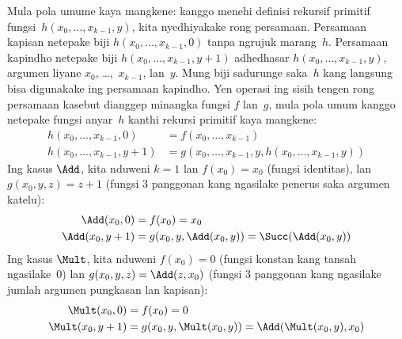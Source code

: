 \documentclass[../../../include/open-logic-section]{subfiles}
\begin{document}
Mula pola umume kaya mangkene: kanggo menehi definisi rekursif
primitif fungsi~$h(x_0, \dots, x_{k-1}, y)$, kita nyedhiyakake
rong persamaan. Persamaan kapisan netepake biji
$h(x_0, \dots, x_{k-1}, 0)$ tanpa ngrujuk marang~$h$.
Persamaan kapindho netepake biji $h(x_0,
\dots, x_{k-1}, y+1)$ adhedhasar $h(x_0, \dots, x_{k-1}, y)$,
argumen liyane $x_0$, \dots,~$x_{k-1}$, lan~$y$.
Mung biji sadurunge saka~$h$ kang langsung bisa digunakake
ing persamaan kapindho. Yen operasi ing sisih tengen rong
persamaan kasebut dianggep minangka fungsi $f$ lan~$g$,
mula pola umum kanggo netepake fungsi anyar~$h$ kanthi
rekursi primitif kaya mangkene:
\begin{align*}
  h(x_0, \dots, x_{k-1}, 0) & = f(x_0, \dots, x_{k-1})\\
  h(x_0, \dots, x_{k-1}, y+1) & =
  g(x_0, \dots, x_{k-1}, y, h(x_0, \dots, x_{k-1}, y))
\end{align*}
Ing kasus $\Add$, kita nduweni $k=1$ lan $f(x_0) = x_0$
(fungsi identitas), lan $g(x_0, y, z) = z + 1$
(fungsi $3$ panggonan kang ngasilake penerus saka argumen
katelu):
\begin{align*}
  \Add(x_0, 0) & = f(x_0) = x_0\\
  \Add(x_0, y+1) & = g(x_0, y, \Add(x_0, y)) =
  \Succ(\Add(x_0, y))
\end{align*}
Ing kasus $\Mult$, kita nduweni $f(x_0) = 0$
(fungsi konstan kang tansah ngasilake~$0$) lan
$g(x_0, y, z) = \Add(z,x_0)$ (fungsi $3$ panggonan
kang ngasilake jumlah argumen pungkasan lan kapisan):
\begin{align*}
  \Mult(x_0,0) & =  f(x_0) = 0 \\
  \Mult(x_0,y+1) & =  g(x_0, y, \Mult(x_0,y)) =
  \Add(\Mult(x_0,y), x_0)
\end{align*}
\end{document}
